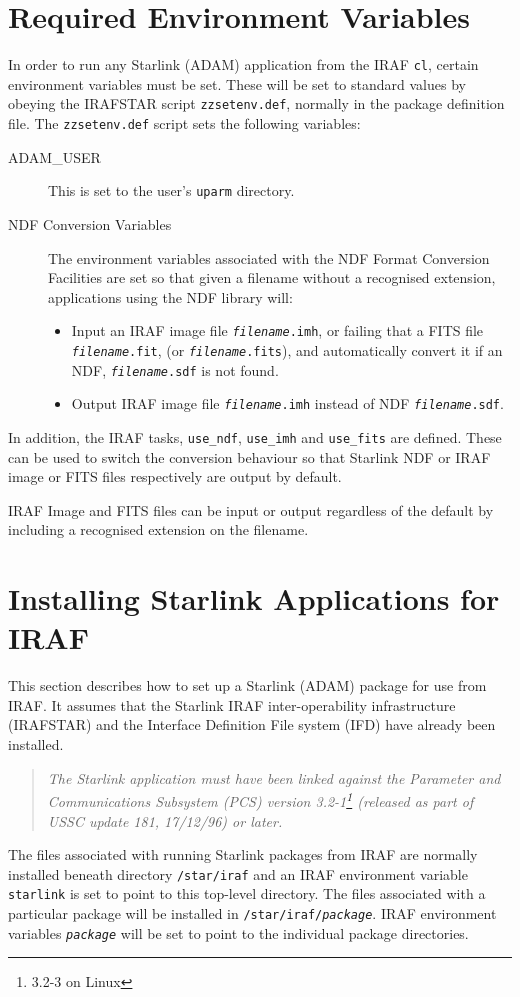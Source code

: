 \documentclass[twoside,11pt]{article}
\newcommand{\htmlref}[2]{#1}
\newcommand{\xref}[3]{#1}
\newcommand{\xlabel}[1]{}
\newcommand{\itfile}[2]{\texttt{\textit{#1}#2}}
\newcommand{\cl}{\texttt{cl}}
\begin{document}
\section{\xlabel{required_environment_variables}Required Environment Variables}
In order to run any Starlink (ADAM) application from the IRAF \cl, certain
environment variables must be set. These will be set to standard values by
obeying the IRAFSTAR script \texttt{zzsetenv.def}, normally in the
\htmlref{package definition file}
{pkg_def_files}.
The \texttt{zzsetenv.def} script sets the following variables:
\begin{description}
\item[ADAM\_USER] This is set to the user's \texttt{uparm} directory.
\item[NDF Conversion Variables] The environment variables associated with the
\xref{NDF Format Conversion Facilities}{ssn20}{}
are set so that given a filename without a recognised extension, applications
using the NDF library will:
\begin{itemize}
\item Input an IRAF image file \itfile{filename}{.imh},
or failing that a FITS file \itfile{filename}{.fit},
(or \itfile{filename}{.fits}),
and automatically convert it if an NDF,
\itfile{filename}{.sdf} is not found.
\item Output IRAF image file \itfile{filename}{.imh} instead of NDF
\itfile{filename}{.sdf}.
\end{itemize}
\end{description}
In addition, the IRAF tasks, \texttt{use\_ndf}, \texttt{use\_imh} and
\texttt{use\_fits} are defined.
These can be used to switch the conversion behaviour so that Starlink NDF or
IRAF image or FITS files respectively are output by default.

IRAF Image and FITS files can be input or output regardless of the default by
including a recognised extension on the filename.

\section{\xlabel{installing_starlink_applications_for_iraf}\label{installing}Installing Starlink Applications for IRAF}
This section describes how to set up a Starlink (ADAM) package for use from
IRAF.
It assumes that the Starlink IRAF inter-operability infrastructure (IRAFSTAR)
and the Interface Definition File system (IFD) have already been installed.
\begin{quote}
\emph{The Starlink application must have been linked against the Parameter
and Communications Subsystem (PCS) version 3.2-1\footnote{3.2-3 on Linux}
(released as part of USSC update 181, 17/12/96) or later.}
\end{quote}
The files associated with running Starlink packages from IRAF are normally
installed beneath directory \texttt{/star/iraf} and an IRAF environment
variable \texttt{starlink} is set to point to this top-level directory.
The files associated with a particular package will be installed in
\texttt{/star/iraf/\textit{package}}.
IRAF environment variables \texttt{\textit{package}}
will be set to point to the individual package directories.
\end{document}
